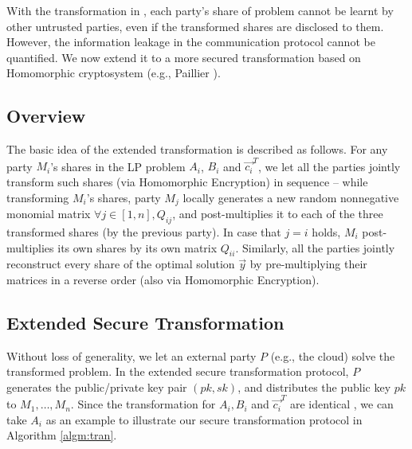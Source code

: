 With the transformation in \cite{HongIJER15}, each party's share of problem cannot be learnt by other untrusted parties, even if the transformed shares are disclosed to them. However, the information leakage in the communication protocol cannot be quantified. We now extend it to a more secured transformation based on Homomorphic cryptosystem (e.g., Paillier \cite{Paillier99}).\footnotemark[1]



\subsection{Overview}

The basic idea of the extended transformation is described as follows. For any party $M_i$'s shares in the LP problem $A_i$, $B_i$ and $\vec{c_i}^T$, we let all the parties jointly transform such shares (via Homomorphic Encryption) in sequence -- while transforming $M_i$'s shares, party $M_j$ locally generates a new random nonnegative monomial matrix $\forall j\in[1,n], Q_{ij}$, and post-multiplies it to each of the three transformed shares (by the previous party). In case that $j=i$ holds, $M_i$ post-multiplies its own shares by its own matrix $Q_{ii}$. Similarly, all the parties jointly reconstruct every share of the optimal solution $\vec{y}$ by pre-multiplying their matrices in a reverse order (also via Homomorphic Encryption). 

\subsection{Extended Secure Transformation}

Without loss of generality, we let an external party $P$ (e.g., the cloud) solve the transformed problem. In the extended secure transformation protocol, $P$ generates the public/private key pair $(pk, sk)$, and distributes the public key $pk$ to $M_1,\dots, M_n$. Since the transformation for $A_i, B_i$ and $\vec{c_i}^T$ are identical \cite{HongIJER15}, we can take $A_i$ as an example to illustrate our secure transformation protocol in Algorithm \ref{algm:tran}.


